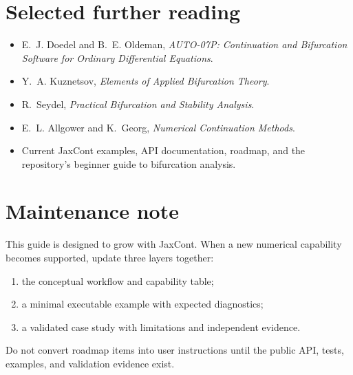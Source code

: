 \documentclass[11pt,oneside]{book}
\begin{document}
\chapter{Selected further reading}

\begin{itemize}
  \item E.~J. Doedel and B.~E. Oldeman, \emph{AUTO-07P: Continuation and
        Bifurcation Software for Ordinary Differential Equations}.
  \item Y.~A. Kuznetsov, \emph{Elements of Applied Bifurcation Theory}.
  \item R.~Seydel, \emph{Practical Bifurcation and Stability Analysis}.
  \item E.~L. Allgower and K.~Georg, \emph{Numerical Continuation Methods}.
  \item Current JaxCont examples, API documentation, roadmap, and the
        repository's beginner guide to bifurcation analysis.
\end{itemize}

\backmatter
\chapter*{Maintenance note}

This guide is designed to grow with JaxCont. When a new numerical capability
becomes supported, update three layers together:

\begin{enumerate}
  \item the conceptual workflow and capability table;
  \item a minimal executable example with expected diagnostics;
  \item a validated case study with limitations and independent evidence.
\end{enumerate}

Do not convert roadmap items into user instructions until the public API,
tests, examples, and validation evidence exist.
\end{document}
